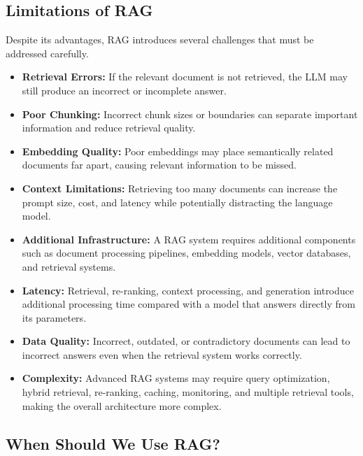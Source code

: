 \subsection*{Limitations of RAG}

Despite its advantages, RAG introduces several challenges that must be addressed carefully.

\begin{itemize}

    \item \textbf{Retrieval Errors:}
    If the relevant document is not retrieved, the LLM may still produce an incorrect or incomplete answer.

    \item \textbf{Poor Chunking:}
    Incorrect chunk sizes or boundaries can separate important information and reduce retrieval quality.

    \item \textbf{Embedding Quality:}
    Poor embeddings may place semantically related documents far apart, causing relevant information to be missed.

    \item \textbf{Context Limitations:}
    Retrieving too many documents can increase the prompt size, cost, and latency while potentially distracting the language model.

    \item \textbf{Additional Infrastructure:}
    A RAG system requires additional components such as document processing pipelines, embedding models, vector databases, and retrieval systems.

    \item \textbf{Latency:}
    Retrieval, re-ranking, context processing, and generation introduce additional processing time compared with a model that answers directly from its parameters.

    \item \textbf{Data Quality:}
    Incorrect, outdated, or contradictory documents can lead to incorrect answers even when the retrieval system works correctly.

    \item \textbf{Complexity:}
    Advanced RAG systems may require query optimization, hybrid retrieval, re-ranking, caching, monitoring, and multiple retrieval tools, making the overall architecture more complex.

\end{itemize}

\subsection*{When Should We Use RAG?}

